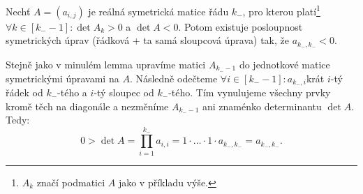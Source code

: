 \documentclass[10pt]{article}                   %
\begin{document}
\begin{lemma}
    Nechť $A = (a_{i, j})$ je reálná symetrická matice řádu $k_-$, pro kterou platí\footnote{$A_k$ značí podmatici $A$ jako v příkladu výše.} $\forall k \in [k_- - 1]: \det A_k > 0$ a $\det A < 0$. Potom existuje posloupnost symetrických úprav (řádková + ta samá sloupcová úprava) tak, že $a_{k_-, k_-} < 0$.

    \begin{dukazin}
        Stejně jako v minulém lemma upravíme matici $A_{k_- - 1}$ do jednotkové matice symetrickými úpravami na $A$. Následně odečteme $\forall i \in [k_- - 1]: a_{k_-, i}$krát $i$-tý řádek od $k_-$-tého a $i$-tý sloupec od $k_-$-tého. Tím vynulujeme všechny prvky kromě těch na diagonále a nezměníme $A_{k_- - 1}$ ani znaménko determinantu $\det A$. Tedy:
        $$ 0 > \det A = \prod_{i = 1}^{k_-} a_{i, i} = 1·…·1·a_{k_-, k_-} = a_{k_-, k_-}. $$ 
    \end{dukazin}
\end{lemma}
\end{document}
